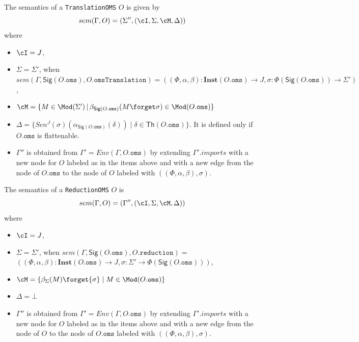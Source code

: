 \documentclass[10pt, a4paper]{isov2}
\newcommand*{\syntax}[1]{\texttt{#1}}
\newcommand{\Sig}{\mathsf{Sig}}
\renewcommand{\Th}{\mathsf{Th}}
\newcommand{\Inst}{\ensuremath{\mathbf{Inst}}}
\begin{document}

The semantics of a \syntax{TranslationOMS} $O$ is given by
$$sem(\Gamma, O) = (\Sigma'',(\cI,\Sigma,\cM,\Delta))$$
\noindent where
\begin{itemize}
 \item $\cI = J$,
 \item $\Sigma = \Sigma'$, when
 $sem(\Gamma, \Sig(O.\syntax{oms}), O.\syntax{omsTranslation}) = ((\Phi, \alpha, \beta) : \Inst(O.\syntax{oms}) \to J, \sigma:\Phi(\Sig(O.\syntax{oms}))\to \Sigma') $,
 \item $\cM = \{M \in \Mod(\Sigma') \,|\, \beta_{\Sig(O.\syntax{oms})}(M\forget\sigma)\in \Mod(O.\syntax{oms})\}$
 \item $\Delta = \{   Sen^J(\sigma)(\alpha_{\Sig(O.\syntax{oms})}(\delta))  \mid \delta \in \Th(O.\syntax{oms}) \}$. It is defined only if $O.\syntax{oms}$ is flattenable.
 \item $\Gamma''$ is obtained from
       $\Gamma' = Env(\Gamma, O.\syntax{oms})$
       by extending $\Gamma'.imports$
        with a new node for $O$ labeled as in the items above
        and with a new edge from the node of $O.\syntax{oms}$ to the node of $O$
        labeled with $((\Phi, \alpha, \beta), \sigma)$.
\end{itemize}

The semantics of a \syntax{ReductionOMS} $O$ is
$$sem(\Gamma, O) = (\Gamma'',(\cI,\Sigma,\cM,\Delta))$$
\noindent where
\begin{itemize}
  \item $\cI = J$,
  \item $\Sigma = \Sigma'$, when
   $sem(\Gamma, \Sig(O.\syntax{oms}), O.\syntax{reduction}) = $\\  $((\Phi, \alpha, \beta) : \Inst(O.\syntax{oms}) \to J,\sigma:\Sigma'\to \Phi(\Sig(O.\syntax{oms})))$,
  \item $\cM = \{\beta_\Sigma(M)\forget{\sigma} \mid M\in \Mod(O.\syntax{oms})\}$
  \item $\Delta = \bot$
  \item $\Gamma''$ is obtained from
       $\Gamma' = Env(\Gamma, O.\syntax{oms})$
       by extending $\Gamma'.imports$
        with a new node for $O$ labeled as in the items above
        and with a new edge from the node of $O$ to the node of
        $O.\syntax{oms}$ labeled with
        $((\Phi, \alpha, \beta),\sigma)$.
\end{itemize}

\end{document}
